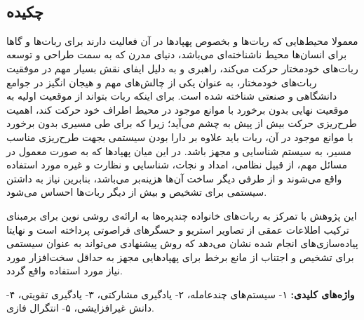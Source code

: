 
\setcounter{page}{1}
\thispagestyle{empty}

~\vfill

\subsection*{چکیده}
\begin{small}
\baselineskip=0.7cm
معمولا محیط‌هایی که ربات‌ها و بخصوص پهپادها در آن فعالیت دارند برای ربات‌ها و گاها برای انسان‌ها محیط‌ ناشناخته‌ای می‌باشد، دنیای مدرن که به سمت طراحی و توسعه ربات‌های خودمختار حرکت می‌کند، راهبری و  به دلیل ایفای نقش بسیار مهم در موفقیت ربات‌های خودمختار، به عنوان یکی از چالش‌های مهم و هیجان انگیز در جوامع دانشگاهی و صنعتی شناخته شده است. برای اینکه ربات بتواند از موقعیت اولیه به موقعیت نهایی بدون برخورد با موانع موجود در محیط اطراف خود حرکت کند، اهمیت طرح‌ریزی حرکت بیش از پیش به چشم می‌آید؛ زیرا که برای طی مسیری بدون برخورد با موانع موجود در آن، ربات باید علاوه بر دارا بودن سیستمی بجهت طرح‌ریزی مناسب مسیر، به سیستم شناسایی و  مجهز باشد. در این میان پهپادها که به صورت معمول در مسائل مهم، از قبیل نظامی، امداد و نجات، شناسایی و نظارت و غیره مورد استفاده واقع می‌شوند و از طرفی دیگر ساخت آن‌ها هزینه‌بر می‌باشد، بنابرین نیاز به داشتن سیستمی برای تشخیص و  بیش از دیگر ربات‌ها احساس می‌شود.

این پژوهش با تمرکز به ربات‌های خانواده چندپره‌ها به ارائه‌ی روشی نوین برای  برمبنای ترکیب اطلاعات عمقی از تصاویر استریو و حسگرهای فراصوتی پرداخته است و نهایتا پیاده‌سازی‌های انجام شده نشان می‌دهد که روش پیشنهادی می‌تواند به عنوان سیستمی برای تشخیص و اجتناب از مانع برخط برای پهپادهایی مجهز به حداقل سخت‌افزار مورد نیاز مورد استفاده واقع گردد.
\vspace*{0.5 cm}

\noindent\textbf{واژه‌های کلیدی:}
۱- سیستم‌های چندعامله، ۲- یادگیری مشارکتی، ۳- یادگیری تقویتی، ۴- دانش غیرافزایشی، ۵- انتگرال فازی.
\end{small}